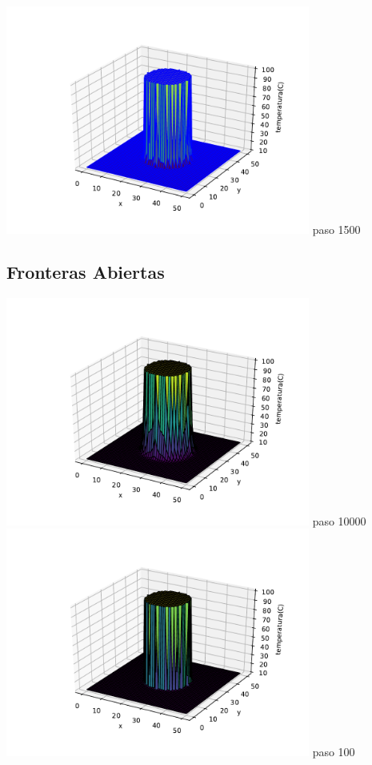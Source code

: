 \documentclass[12pt]{article}
\begin{document}
\begin{centering}
\includegraphics[width=0.75\textwidth]{3d4.pdf}
paso 1500
\subsection{Fronteras Abiertas}
\includegraphics[width=0.75\textwidth]{3d5.pdf}
paso 10000
\\
\includegraphics[width=0.75\textwidth]{3d6.pdf}
paso 100
\\

\end{centering}
\end{document}
